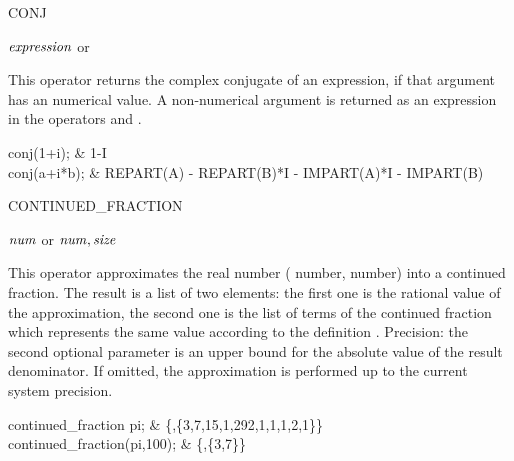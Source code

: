 \begin{Operator}{CONJ}

\begin{Syntax}
\(\meta{expression}\) or  
\end{Syntax}
This operator returns the complex conjugate of an expression, if that
argument has an numerical value.  A non-numerical argument is returned as
an expression in the operators  and .

\begin{Examples}
conj(1+i); & 1-I \\
conj(a+i*b); & REPART(A) - REPART(B)*I - IMPART(A)*I - IMPART(B)
\end{Examples}

\end{Operator}

\begin{Operator}{CONTINUED_FRACTION}

\begin{Syntax}
\(\meta{num}\) 
or \( \meta{num},\meta{size}\)
\end{Syntax}
This operator approximates the real number 
(  number,  number)
into a continued fraction. The result is a list of two elements: the
first one is the rational value of the approximation, the second one
is the list of terms of the continued fraction which represents the
same value according to the definition .
Precision: the second optional parameter  is an upper bound
for the absolute value of the result denominator. If omitted, the
approximation is performed up to the current system precision.


\begin{Examples}
continued_fraction pi;
 & \{,\{3,7,15,1,292,1,1,1,2,1\}\} \\
continued_fraction(pi,100);
 & \{,\{3,7\}\} \\
\end{Examples}

\end{Operator}

